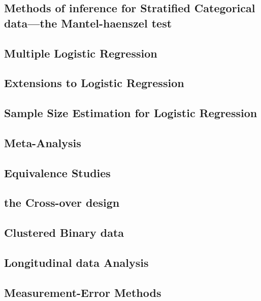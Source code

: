 \documentclass[12pt,]{article}
\theoremstyle{definition}
\theoremstyle{definition}
\theoremstyle{definition}
\theoremstyle{remark}
\begin{document}
\subsection{Methods of inference for Stratified Categorical data---the
Mantel-haenszel
test}\label{methods-of-inference-for-stratified-categorical-datathe-mantel-haenszel-test}

\subsection{Multiple Logistic
Regression}\label{multiple-logistic-regression}

\subsection{Extensions to Logistic
Regression}\label{extensions-to-logistic-regression}

\subsection{Sample Size Estimation for Logistic
Regression}\label{sample-size-estimation-for-logistic-regression}

\subsection{Meta-Analysis}\label{meta-analysis}

\subsection{Equivalence Studies}\label{equivalence-studies}

\subsection{the Cross-over design}\label{the-cross-over-design}

\subsection{Clustered Binary data}\label{clustered-binary-data}

\subsection{Longitudinal data
Analysis}\label{longitudinal-data-analysis}

\subsection{Measurement-Error Methods}\label{measurement-error-methods}
\end{document}
